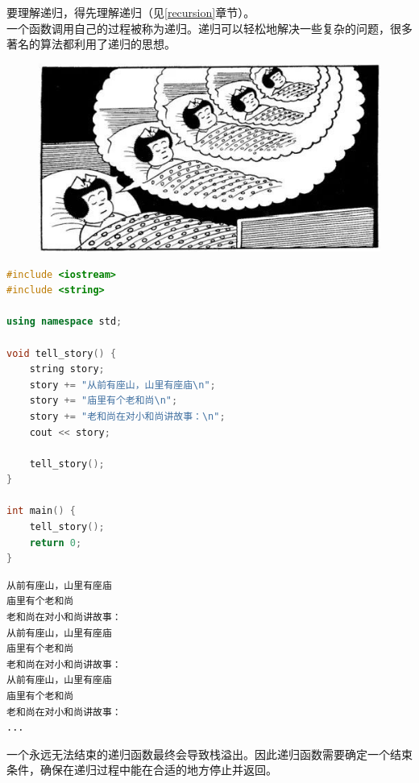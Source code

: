 要理解递归，得先理解递归（见\ref{recursion}章节）。\\

一个函数调用自己的过程被称为递归。递归可以轻松地解决一些复杂的问题，很多著名的算法都利用了递归的思想。

\begin{figure}[H]
	\centering
	\includegraphics[scale=0.7]{img/Chapter5/5-3/1.png}
\end{figure}

\vspace{0.5cm}


\begin{lstlisting}[language=C++]
#include <iostream>
#include <string>

using namespace std;

void tell_story() {
	string story;
	story += "从前有座山，山里有座庙\n";
	story += "庙里有个老和尚\n";
	story += "老和尚在对小和尚讲故事：\n";
	cout << story;

	tell_story();
}

int main() {
	tell_story();
	return 0;
}
\end{lstlisting}

\begin{tcolorbox}
	\begin{verbatim}
从前有座山，山里有座庙
庙里有个老和尚
老和尚在对小和尚讲故事：
从前有座山，山里有座庙
庙里有个老和尚
老和尚在对小和尚讲故事：
从前有座山，山里有座庙
庙里有个老和尚
老和尚在对小和尚讲故事：
...
	\end{verbatim}
\end{tcolorbox}

一个永远无法结束的递归函数最终会导致栈溢出。因此递归函数需要确定一个结束条件，确保在递归过程中能在合适的地方停止并返回。\\

